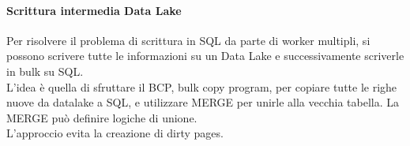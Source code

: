 \paragraph{Scrittura intermedia Data Lake}
Per risolvere il problema di scrittura in SQL da parte di worker multipli, si possono 
scrivere tutte le informazioni su un Data Lake e successivamente scriverle in bulk su SQL.\\
L'idea è quella di sfruttare il BCP, bulk copy program, per copiare tutte le righe nuove 
da datalake a SQL, e utilizzare MERGE per unirle alla vecchia tabella. La MERGE può definire 
logiche di unione.\\
L'approccio evita la creazione di dirty pages.

